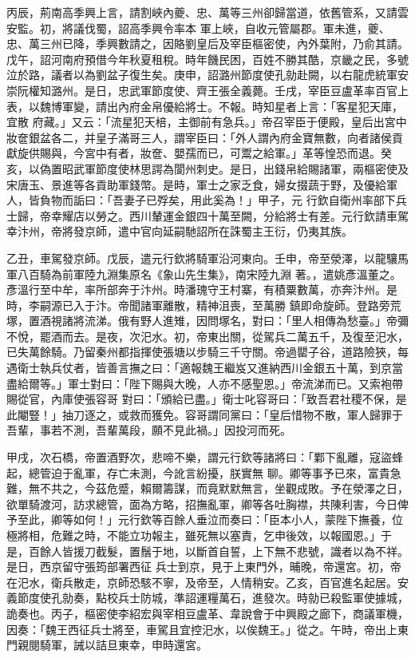 \begin{pinyinscope}
 丙辰，荊南高季興上言，請割峽內夔、忠、萬等三州卻歸當道，依舊管系，又請雲安監。初，將議伐蜀，詔高季興令率本
 軍上峽，自收元管屬郡。軍未進，夔、忠、萬三州已降，季興數請之，因賂劉皇后及宰臣樞密使，內外葉附，乃俞其請。戊午，詔河南府預借今年秋夏租稅。時年饑民困，百姓不勝其酷，京畿之民，多號泣於路，議者以為劉盆子復生矣。庚申，詔潞州節度使孔勍赴闕，以右龍虎統軍安崇阮權知潞州。是日，忠武軍節度使、齊王張全義薨。壬戌，宰臣豆盧革率百官上表，以魏博軍變，請出內府金帛優給將士。不報。時知星者上言：「客星犯天庫，宜散
 府藏。」又云：「流星犯天棓，主御前有急兵。」帝召宰臣于便殿，皇后出宮中妝奩銀盆各二，并皇子滿哥三人，謂宰臣曰：「外人謂內府金寶無數，向者諸侯貢獻旋供賜與，今宮中有者，妝奩、嬰孺而已，可鬻之給軍。」革等惶恐而退。癸亥，以偽置昭武軍節度使林思諤為閬州刺史。是日，出錢帛給賜諸軍，兩樞密使及宋唐玉、景進等各貢助軍錢幣。是時，軍士之家乏食，婦女掇蔬于野，及優給軍人，皆負物而詬曰：「吾妻子已殍矣，用此奚為！」甲子，元
 行欽自衛州率部下兵士歸，帝幸耀店以勞之。西川輦運金銀四十萬至闕，分給將士有差。元行欽請車駕幸汴州，帝將發京師，遣中官向延嗣馳詔所在誅蜀主王衍，仍夷其族。


乙丑，車駕發京師。戊辰，遣元行欽將騎軍沿河東向。壬申，帝至滎澤，以龍驤馬軍八百騎為前軍陸九淵集原名《象山先生集》，南宋陸九淵
 著。，遣姚彥溫董之。彥溫行至中牟，率所部奔于汴州。時潘瑰守王村寨，有積粟數萬，亦奔汴州。是時，李嗣源已入于汴。帝聞諸軍離散，精神沮喪，至萬勝
 鎮即命旋師。登路旁荒塚，置酒視諸將流涕。俄有野人進雉，因問塚名，對曰：「里人相傳為愁臺。」帝彌不悅，罷酒而去。是夜，次汜水。初，帝東出關，從駕兵二萬五千，及復至汜水，已失萬餘騎。乃留秦州都指揮使張塘以步騎三千守關。帝過罌子谷，道路險狹，每遇衛士執兵仗者，皆善言撫之曰：「適報魏王繼岌又進納西川金銀五十萬，到京當盡給爾等。」軍士對曰：「陛下賜與大晚，人亦不感聖恩。」帝流涕而已。又索袍帶賜從官，內庫使張容哥
 對曰：「頒給已盡。」衛士叱容哥曰：「致吾君社稷不保，是此閹豎！」抽刀逐之，或救而獲免。容哥謂同黨曰：「皇后惜物不散，軍人歸罪于吾輩，事若不測，吾輩萬段，願不見此禍。」因投河而死。



 甲戌，次石橋，帝置酒野次，悲啼不樂，謂元行欽等諸將曰：「鄴下亂離，寇盜蜂起，總管迫于亂軍，存亡未測，今訛言紛擾，朕實無
 聊。卿等事予已來，富貴急難，無不共之，今茲危蹙，賴爾籌謀，而竟默默無言，坐觀成敗。予在滎澤之日，欲單騎渡河，訪求總管，面為方略，招撫亂軍，卿等各吐胸襟，共陳利害，今日俾予至此，卿等如何！」元行欽等百餘人垂泣而奏曰：「臣本小人，蒙陛下撫養，位極將相，危難之時，不能立功報主，雖死無以塞責，乞申後效，以報國恩。」于是，百餘人皆援刀截髮，置鬚于地，以斷首自誓，上下無不悲號，識者以為不祥。是日，西京留守張筠部署西征
 兵士到京，見于上東門外，晡晚，帝還宮。初，帝在汜水，衛兵散走，京師恐駭不寧，及帝至，人情稍安。乙亥，百官進名起居。安義節度使孔勍奏，點校兵士防城，準詔運糧萬石，進發次。時勍已殺監軍使據城，詭奏也。丙子，樞密使李紹宏與宰相豆盧革、韋說會于中興殿之廊下，商議軍機，因奏：「魏王西征兵士將至，車駕且宜控汜水，以俟魏王。」從之。午時，帝出上東門親閱騎軍，誡以詰旦東幸，申時還宮。




\end{pinyinscope}
